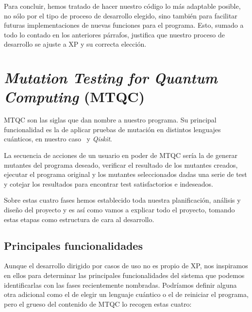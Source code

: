 Para concluir, hemos tratado de hacer nuestro código lo más adaptable posible, no sólo por el tipo de proceso de desarrollo elegido, sino también para facilitar futuras implementaciones de nuevas funciones para el programa. Esto, sumado a todo lo contado en los anteriores párrafos, justifica que nuestro proceso de desarrollo se ajuste a XP y su correcta elección.

\section{\textit{Mutation Testing for Quantum Computing} (MTQC)}

MTQC son las siglas que dan nombre a nuestro programa. Su principal funcionalidad es la de aplicar pruebas de mutación en distintos lenguajes cuánticos, en nuestro caso \qsh\ y \textit{Qiskit}.

La secuencia de acciones de un usuario en poder de MTQC sería la de generar mutantes del programa deseado, verificar el resultado de los mutantes creados, ejecutar el programa original y los mutantes seleccionados dadas una serie de test y cotejar los resultados para encontrar test satisfactorios e indeseados.

Sobre estas cuatro fases hemos establecido toda nuestra planificación, análisis y diseño del proyecto y es así como vamos a explicar todo el proyecto, tomando estas etapas como estructura de cara al desarrollo.

\subsection{Principales funcionalidades}

Aunque el desarrollo dirigido por casos de uso no es propio de XP, nos inspiramos en ellos para determinar las principales funcionalidades del sistema que podemos identificarlas con las fases recientemente nombradas. Podríamos definir alguna otra adicional como el de elegir un lenguaje cuántico o el de reiniciar el programa, pero el grueso del contenido de MTQC lo recogen estas cuatro:

